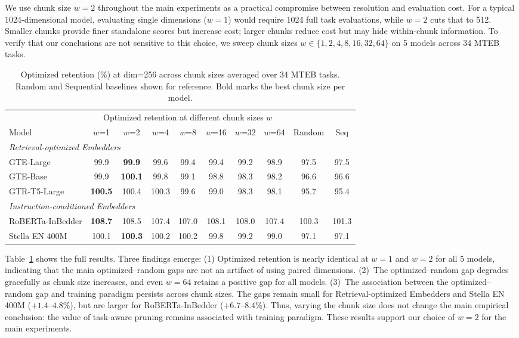 \documentclass[11pt]{article}
\begin{document}
We use chunk size $w = 2$ throughout the main experiments as a practical compromise between resolution and evaluation cost. For a typical 1024-dimensional model, evaluating single dimensions ($w = 1$) would require 1024 full task evaluations, while $w = 2$ cuts that to 512. Smaller chunks provide finer standalone scores but increase cost; larger chunks reduce cost but may hide within-chunk information. To verify that our conclusions are not sensitive to this choice, we sweep chunk sizes $w \in \{1, 2, 4, 8, 16, 32, 64\}$ on 5 models across 34 MTEB tasks.

\begin{table}[h]
    \centering
    \caption{Optimized retention (\%) at dim=256 across chunk sizes averaged over 34 MTEB tasks. Random and Sequential baselines shown for reference. Bold marks the best chunk size per model.}
    \label{tab:chunk_sweep_full}
    \small
    \resizebox{\textwidth}{!} {
    \begin{tabular}{lccccccccc}
        \toprule
        & \multicolumn{7}{c}{Optimized retention at different chunk sizes $w$} & & \\
        \cmidrule(lr){2-8}
        Model & $w$=1 & $w$=2 & $w$=4 & $w$=8 & $w$=16 & $w$=32 & $w$=64 & Random & Seq \\
        \midrule
        \multicolumn{10}{l}{\textit{Retrieval-optimized Embedders}} \\
        GTE-Large & 99.9 & \textbf{99.9} & 99.6 & 99.4 & 99.4 & 99.2 & 98.9 & 97.5 & 97.5 \\
        GTE-Base & 99.9 & \textbf{100.1} & 99.8 & 99.1 & 98.8 & 98.3 & 98.2 & 96.6 & 96.6 \\
        GTR-T5-Large & \textbf{100.5} & 100.4 & 100.3 & 99.6 & 99.0 & 98.3 & 98.1 & 95.7 & 95.4 \\
        \midrule
        \multicolumn{10}{l}{\textit{Instruction-conditioned Embedders}} \\
        RoBERTa-InBedder & \textbf{108.7} & 108.5 & 107.4 & 107.0 & 108.1 & 108.0 & 107.4 & 100.3 & 101.3 \\
        Stella EN 400M & 100.1 & \textbf{100.3} & 100.2 & 100.2 & 99.8 & 99.2 & 99.0 & 97.1 & 97.1 \\
        \bottomrule
    \end{tabular}
    }
\end{table}

Table~\ref{tab:chunk_sweep_full} shows the full results. Three findings emerge: (1) Optimized retention is nearly identical at $w = 1$ and $w = 2$ for all 5 models, indicating that the main optimized–random gaps are not an artifact of using paired dimensions. (2)~The optimized--random gap degrades gracefully as chunk size increases, and even $w = 64$ retains a positive gap for all models. (3)~The association between the optimized--random gap and training paradigm persists across chunk sizes. The gaps remain small for Retrieval-optimized Embedders and Stella EN 400M ($+1.4$--$4.8$\%), but are larger for RoBERTa-InBedder ($+6.7$--$8.4$\%). Thus, varying the chunk size does not change the main empirical conclusion: the value of task-aware pruning remains associated with training paradigm. These results support our choice of $w = 2$ for the main experiments.
\end{document}
